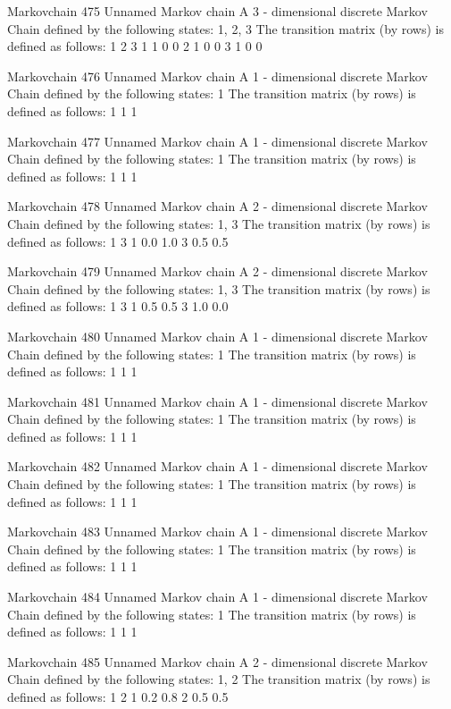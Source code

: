 \documentclass[
  nojss]{jss}
\begin{document}
\begin{CodeChunk}
\begin{CodeOutput}
Markovchain  475 
Unnamed Markov chain 
 A  3 - dimensional discrete Markov Chain defined by the following states: 
 1, 2, 3 
 The transition matrix  (by rows)  is defined as follows: 
  1 2 3
1 1 0 0
2 1 0 0
3 1 0 0

Markovchain  476 
Unnamed Markov chain 
 A  1 - dimensional discrete Markov Chain defined by the following states: 
 1 
 The transition matrix  (by rows)  is defined as follows: 
  1
1 1

Markovchain  477 
Unnamed Markov chain 
 A  1 - dimensional discrete Markov Chain defined by the following states: 
 1 
 The transition matrix  (by rows)  is defined as follows: 
  1
1 1

Markovchain  478 
Unnamed Markov chain 
 A  2 - dimensional discrete Markov Chain defined by the following states: 
 1, 3 
 The transition matrix  (by rows)  is defined as follows: 
    1   3
1 0.0 1.0
3 0.5 0.5

Markovchain  479 
Unnamed Markov chain 
 A  2 - dimensional discrete Markov Chain defined by the following states: 
 1, 3 
 The transition matrix  (by rows)  is defined as follows: 
    1   3
1 0.5 0.5
3 1.0 0.0

Markovchain  480 
Unnamed Markov chain 
 A  1 - dimensional discrete Markov Chain defined by the following states: 
 1 
 The transition matrix  (by rows)  is defined as follows: 
  1
1 1

Markovchain  481 
Unnamed Markov chain 
 A  1 - dimensional discrete Markov Chain defined by the following states: 
 1 
 The transition matrix  (by rows)  is defined as follows: 
  1
1 1

Markovchain  482 
Unnamed Markov chain 
 A  1 - dimensional discrete Markov Chain defined by the following states: 
 1 
 The transition matrix  (by rows)  is defined as follows: 
  1
1 1

Markovchain  483 
Unnamed Markov chain 
 A  1 - dimensional discrete Markov Chain defined by the following states: 
 1 
 The transition matrix  (by rows)  is defined as follows: 
  1
1 1

Markovchain  484 
Unnamed Markov chain 
 A  1 - dimensional discrete Markov Chain defined by the following states: 
 1 
 The transition matrix  (by rows)  is defined as follows: 
  1
1 1

Markovchain  485 
Unnamed Markov chain 
 A  2 - dimensional discrete Markov Chain defined by the following states: 
 1, 2 
 The transition matrix  (by rows)  is defined as follows: 
    1   2
1 0.2 0.8
2 0.5 0.5


\end{CodeOutput}
\end{CodeChunk}
\end{document}
